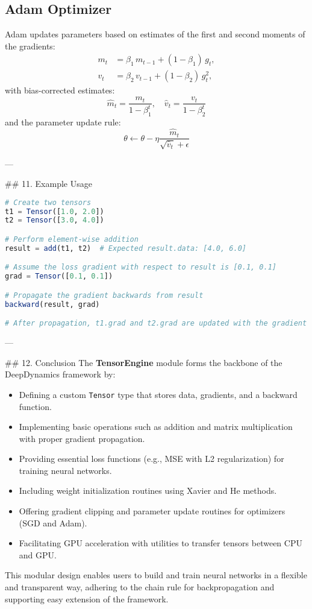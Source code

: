 \documentclass[11pt]{article}
\begin{document}
\subsection*{Adam Optimizer}
Adam updates parameters based on estimates of the first and second moments of the gradients:
\begin{align*}
m_t &= \beta_1 \, m_{t-1} + (1 - \beta_1) \, g_t,\\[1ex]
v_t &= \beta_2 \, v_{t-1} + (1 - \beta_2) \, g_t^2,
\end{align*}
with bias-corrected estimates:
\[
\hat{m}_t = \frac{m_t}{1 - \beta_1^t}, \quad \hat{v}_t = \frac{v_t}{1 - \beta_2^t}
\]
and the parameter update rule:
\[
\theta \leftarrow \theta - \eta \frac{\hat{m}_t}{\sqrt{\hat{v}_t} + \epsilon}
\]

---

## 11. Example Usage
\begin{lstlisting}[language=Julia]
# Create two tensors
t1 = Tensor([1.0, 2.0])
t2 = Tensor([3.0, 4.0])

# Perform element-wise addition
result = add(t1, t2)  # Expected result.data: [4.0, 6.0]

# Assume the loss gradient with respect to result is [0.1, 0.1]
grad = Tensor([0.1, 0.1])

# Propagate the gradient backwards from result
backward(result, grad)

# After propagation, t1.grad and t2.grad are updated with the gradient [0.1, 0.1] (accumulated).
\end{lstlisting}

---

## 12. Conclusion
The \textbf{TensorEngine} module forms the backbone of the DeepDynamics framework by:
\begin{itemize}
    \item Defining a custom \texttt{Tensor} type that stores data, gradients, and a backward function.
    \item Implementing basic operations such as addition and matrix multiplication with proper gradient propagation.
    \item Providing essential loss functions (e.g., MSE with L2 regularization) for training neural networks.
    \item Including weight initialization routines using Xavier and He methods.
    \item Offering gradient clipping and parameter update routines for optimizers (SGD and Adam).
    \item Facilitating GPU acceleration with utilities to transfer tensors between CPU and GPU.
\end{itemize}

This modular design enables users to build and train neural networks in a flexible and transparent way, adhering to the chain rule for backpropagation and supporting easy extension of the framework.
\end{document}
